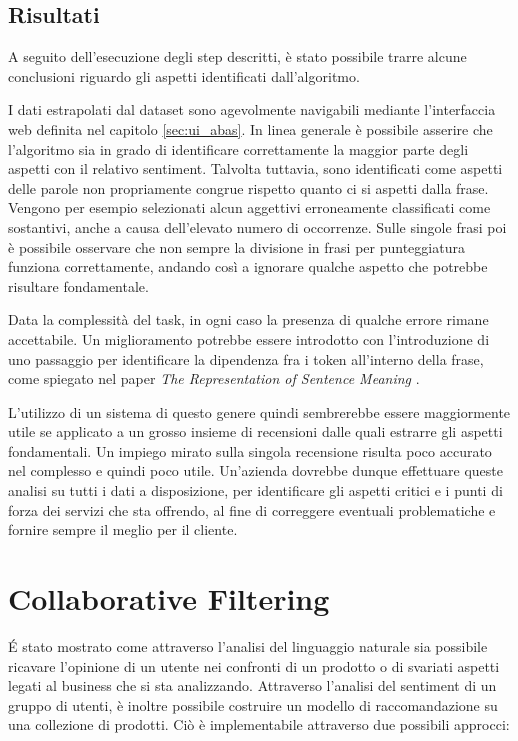 \documentclass[hidelinks, 12pt]{article}
\begin{document}
\subsection{Risultati}

A seguito dell'esecuzione degli step descritti, è stato possibile trarre alcune conclusioni riguardo gli aspetti identificati dall'algoritmo.

I dati estrapolati dal dataset sono agevolmente navigabili mediante l'interfaccia web definita nel capitolo \ref{sec:ui_abas}. In linea generale è possibile asserire che l'algoritmo sia in grado di identificare correttamente la maggior parte degli aspetti con il relativo sentiment. Talvolta tuttavia, sono identificati come aspetti delle parole non propriamente congrue rispetto quanto ci si aspetti dalla frase. Vengono per esempio selezionati alcun aggettivi erroneamente classificati come sostantivi, anche a causa dell'elevato numero di occorrenze. Sulle singole frasi poi è possibile osservare che non sempre la divisione in frasi per punteggiatura funziona correttamente, andando così a ignorare qualche aspetto che potrebbe risultare fondamentale.

Data la complessità del task, in ogni caso la presenza di qualche errore rimane accettabile. Un miglioramento potrebbe essere introdotto con l'introduzione di uno passaggio per identificare la dipendenza fra i token all'interno della frase, come spiegato nel paper \textit{The Representation of Sentence Meaning} \cite{site:the_representation_of_sentence_meaning}.

L'utilizzo di un sistema di questo genere quindi sembrerebbe essere maggiormente utile se applicato a un grosso insieme di recensioni dalle quali estrarre gli aspetti fondamentali. Un impiego mirato sulla singola recensione risulta poco accurato nel complesso e quindi poco utile. Un'azienda dovrebbe dunque effettuare queste analisi su tutti i dati a disposizione, per identificare gli aspetti critici e i punti di forza dei servizi che sta offrendo, al fine di correggere eventuali problematiche e fornire sempre il meglio per il cliente.



\clearpage



\section{Collaborative Filtering}


É stato mostrato come attraverso l'analisi del linguaggio naturale sia possibile ricavare l'opinione di un utente nei confronti di un prodotto o di svariati aspetti legati al business che si sta analizzando. Attraverso l'analisi del sentiment di un gruppo di utenti, è inoltre possibile costruire un modello di raccomandazione su una collezione di prodotti. Ciò è implementabile attraverso due possibili approcci:
\end{document}
